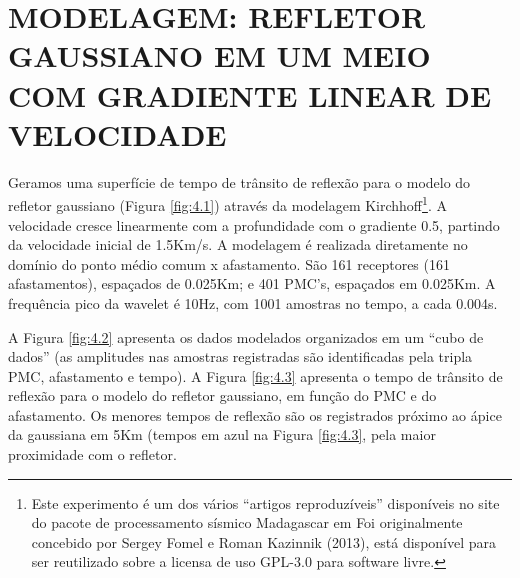 %
% 
% 
% 
% 
% 
% 

\chapter{MODELAGEM: REFLETOR GAUSSIANO EM UM MEIO COM GRADIENTE LINEAR DE VELOCIDADE}

Geramos uma superfície de tempo de trânsito de reflexão para o modelo do refletor gaussiano (Figura \ref{fig:4.1})
através da modelagem Kirchhoff\footnote{Este experimento é um dos vários ``artigos reproduzíveis'' disponíveis no site
do pacote de processamento sísmico Madagascar em %
Foi originalmente concebido por Sergey Fomel e Roman Kazinnik (2013),
está disponível para ser reutilizado sobre a licensa de uso GPL-3.0 para software livre.}\cite{fomel1}.
A velocidade cresce linearmente com a profundidade com o gradiente 0.5, partindo da velocidade inicial de
1.5Km/s. A modelagem é realizada diretamente no domínio do ponto médio comum x afastamento. São 161 receptores (161 afastamentos),
espaçados de 0.025Km; e 401 PMC's, espaçados em 0.025Km. A frequência pico da wavelet é 10Hz, com 1001 amostras no tempo, a
cada 0.004s.

A Figura \ref{fig:4.2} apresenta os dados modelados organizados em um ``cubo de dados'' (as amplitudes nas amostras registradas
são identificadas pela tripla PMC, afastamento e tempo). A Figura \ref{fig:4.3} apresenta o tempo de trânsito de reflexão para o
modelo do refletor gaussiano, em função do PMC e do afastamento. Os menores tempos de reflexão são os registrados próximo ao 
ápice da gaussiana em 5Km (tempos em azul na Figura \ref{fig:4.3}, pela maior proximidade com o refletor.

